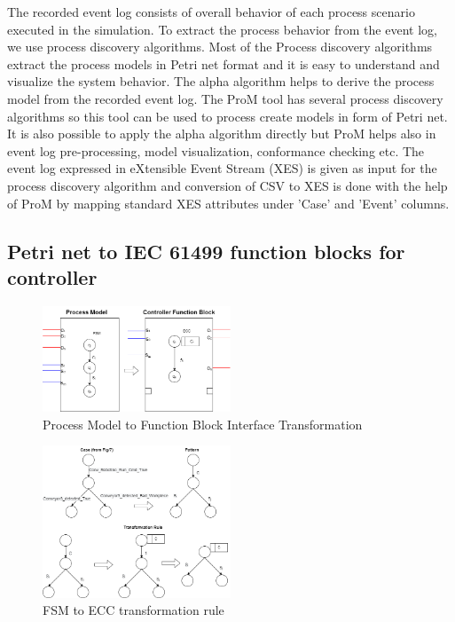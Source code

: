 \begin{bibunit}
The recorded event log consists of overall behavior of each process scenario executed in the simulation. To extract the process behavior from the event log, we use process discovery algorithms. Most of the Process discovery algorithms extract the process models in Petri net format \cite{van2013discovering} and it is easy to understand and visualize the system behavior. The alpha algorithm \cite{van2004workflow}  helps to derive the process model from the recorded event log. The ProM tool has several process discovery algorithms so this tool can be used to process create models in form of Petri net. It is also possible to apply the alpha algorithm directly but ProM  helps also in event log pre-processing, model visualization, conformance checking etc. The event log expressed in eXtensible Event Stream (XES) is given as input for the process discovery algorithm and conversion of CSV to XES is done with the help of ProM by mapping standard XES attributes under 'Case' and 'Event' columns.

\subsection{Petri net to IEC 61499 function blocks for controller}
\label{subsec:PNtoIEC61499}

\begin{figure}[!t]
	\centering
	\includegraphics[width=0.5\textwidth]{MX_Papers/Paper6/images/ControlTransformation.png} 
	\caption{Process  Model  to Function Block Interface Transformation }
	\label{ControllerTransformation}
\end{figure}

\begin{figure}[!t]
	\centering
	\includegraphics[width=0.5\textwidth]{MX_Papers/Paper6/images/UpdatedControllerConversionrules.png}
	\caption{ FSM to ECC transformation rule}
	\label{conversionrules}
\end{figure}


\end{bibunit}

